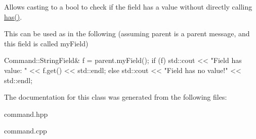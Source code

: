 Allows casting to a bool to check if the field has a value without directly calling {\ttfamily \hyperlink{classhebi_1_1Command_1_1StringField_ae05e05ab9e984b07f8ccc186b1d80833}{has()}}. 

This can be used as in the following (assuming \textquotesingle{}parent\textquotesingle{} is a parent message, and this field is called \textquotesingle{}my\+Field\textquotesingle{}) 
\begin{DoxyCode}
Command::StringField& f = parent.myField();
\textcolor{keywordflow}{if} (f)
  std::cout << \textcolor{stringliteral}{"Field has value: "} << f.get() << std::endl;
\textcolor{keywordflow}{else}
  std::cout << \textcolor{stringliteral}{"Field has no value!"} << std::endl;
\end{DoxyCode}
 

The documentation for this class was generated from the following files\+:\begin{DoxyCompactItemize}
\item 
command.\+hpp\item 
command.\+cpp\end{DoxyCompactItemize}
